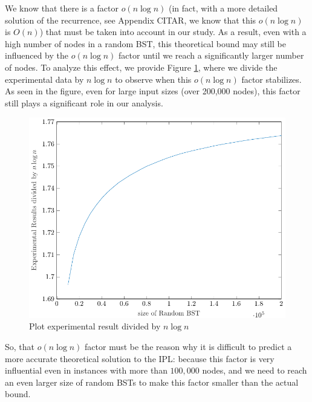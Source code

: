 

We know that there is a factor \( o(n \log n) \) (in fact, with a more detailed solution of the recurrence, see Appendix CITAR, we know that this $o(n \log n)$ is $O(n)$) that must be taken into account in our study. As a result, even with a high number of nodes in a random BST, this theoretical bound may still be influenced by the \( o(n \log n) \) factor until we reach a significantly larger number of nodes. To analyze this effect, we provide Figure \ref{fig:plotBoundCtIPL}, where we divide the experimental data by \( n \log n \) to observe when this \( o(n \log n) \) factor stabilizes. As seen in the figure, even for large input sizes (over 200,000 nodes), this factor still plays a significant role in our analysis.

\begin{figure}[ht]
    \centering
    \includegraphics[scale=0.65]{plotCtIPL.pdf}
    \caption{Plot experimental result divided by $n \log n$}
    \label{fig:plotBoundCtIPL}
\end{figure}

So, that $o(n \log n)$ factor must be the reason why it is difficult to predict a more accurate theoretical solution to the IPL: because this factor is very influential even in instances with more than $100,000$ nodes, and we need to reach an even larger size of random BSTs to make this factor smaller than the actual bound.

